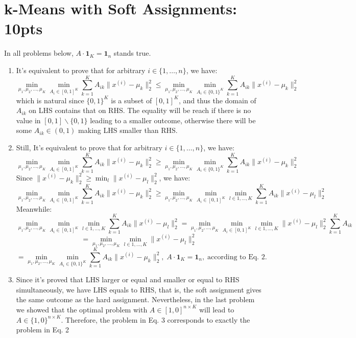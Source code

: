 \documentclass[12pt]{article}
\begin{document}
\section{k-Means with Soft Assignments: 10pts}
In all problems below, $A\cdot\textbf{1}_K = \textbf{1}_n$ stands true.
\begin{enumerate}
    \item It's equivalent to prove that for arbitrary $i\in\{1,\ldots,n\}$, we have:
    \[\min_{\mu_1,\mu_2,\ldots,\mu_K}\min_{A_i\in[0,1]^K}\sum_{k=1}^{K}A_{ik}\|x^{(i)} - \mu_k\|_2^2 \leq \min_{\mu_1,\mu_2,\ldots,\mu_K}\min_{A_i\in\{0,1\}^K}\sum_{k=1}^{K}A_{ik}\|x^{(i)} - \mu_k\|_2^2\]
    which is natural since $\{0,1\}^{K}$ is a subset of $[0,1]^{K}$, and thus the domain of $A_{ik}$ on LHS contains that on RHS. The equality will be reach if there is no value in $[0,1]\backslash\{0,1\}$ leading to a smaller outcome, otherwise there will be some $A_{ik}\in (0,1)$ making LHS smaller than RHS.
    \item Still, It's equivalent to prove that for arbitrary $i\in\{1,\ldots,n\}$, we have:
    \[\min_{\mu_1,\mu_2,\ldots,\mu_K}\min_{A_i\in[0,1]^K}\sum_{k=1}^{K}A_{ik}\|x^{(i)} - \mu_k\|_2^2 \geq \min_{\mu_1,\mu_2,\ldots,\mu_K}\min_{A_i\in\{0,1\}^K}\sum_{k=1}^{K}A_{ik}\|x^{(i)} - \mu_k\|_2^2\]
    Since $\|x^{(i)}-\mu_k\|^2_2 \geq \min_l\|x^{(i)} - \mu_l\|^2_2$, we have:
    \[\min_{\mu_1,\mu_2,\ldots,\mu_K}\min_{A_i\in[0,1]^K}\sum_{k=1}^{K}A_{ik}\|x^{(i)} - \mu_k\|_2^2 \geq \min_{\mu_1,\mu_2,\ldots,\mu_K}\min_{A_i\in[0,1]^K}\min_{l\in{1,\ldots,K}}\sum_{k=1}^{K}A_{ik}\|x^{(i)} - \mu_l\|_2^2\]
    Meanwhile:
    \[\min_{\mu_1,\mu_2,\ldots,\mu_K}\min_{A_i\in[0,1]^K}\min_{l\in{1,\ldots,K}}\sum_{k=1}^{K}A_{ik}\|x^{(i)} - \mu_l\|_2^2 = \min_{\mu_1,\mu_2,\ldots,\mu_K}\min_{A_i\in[0,1]^K}\min_{l\in{1,\ldots,K}}\|x^{(i)} - \mu_l\|_2^2\sum_{k=1}^{K}A_{ik}\]
    \[= \min_{\mu_1,\mu_2,\ldots,\mu_K}\min_{l\in{1,\ldots,K}}\|x^{(i)} - \mu_l\|_2^2\] 
    \[= \min_{\mu_1,\mu_2,\ldots,\mu_K}\min_{A_i\in\{0,1\}^K}\sum_{k=1}^{K}A_{ik}\|x^{(i)} - \mu_k\|_2^2,\;A\cdot\textbf{1}_K = \textbf{1}_n,\;\text{according to Eq. 2.}\]
    \item Since it's proved that LHS larger or equal and smaller or equal to RHS simultaneously, we have LHS equals to RHS, that is, the soft assignment gives the same outcome as the hard assignment. Nevertheless, in the last problem we showed that the optimal problem with $A\in [1,0]^{n\times K}$ will lead to $A\in \{1,0\}^{n\times K}$. Therefore, the problem in Eq. 3 corresponds to exactly the problem in Eq. 2
\end{enumerate}
\newpage
\end{document}
